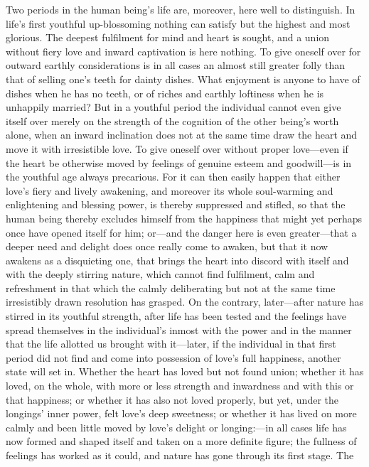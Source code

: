 \documentclass[12pt,a4paper]{book}
\begin{document}
Two periods in the human being's life are, moreover, here well to
distinguish. In life's first youthful up-blossoming nothing can satisfy but
the highest and most glorious. The deepest fulfilment for mind and heart is
sought, and a union without fiery love and inward captivation is here
nothing. To give oneself over for outward earthly considerations is in all
cases an almost still greater folly than that of selling one's teeth for
dainty dishes. What enjoyment is anyone to have of dishes when he has no
teeth, or of riches and earthly loftiness when he is unhappily married? But
in a youthful period the individual cannot even give itself over merely on
the strength of the cognition of the other being's worth alone, when an
inward inclination does not at the same time draw the heart and move it
with irresistible love. To give oneself over without proper love---even if
the heart be otherwise moved by feelings of genuine esteem and
goodwill---is in the youthful age always precarious. For it can then easily
happen that either love's fiery and lively awakening, and moreover its
whole soul-warming and enlightening and blessing power, is thereby
suppressed and stifled, so that the human being thereby excludes himself
from the happiness that might yet perhaps once have opened itself for him;
or---and the danger here is even greater---that a deeper need and delight
does once really come to awaken, but that it now awakens as a disquieting
one, that brings the heart into discord with itself and with the deeply
stirring nature, which cannot find fulfilment, calm and refreshment in that
which the calmly deliberating but not at the same time irresistibly drawn
resolution has grasped. On the contrary, later---after nature has stirred
in its youthful strength, after life has been tested and the feelings have
spread themselves in the individual's inmost with the power and in the
manner that the life allotted us brought with it---later, if the individual
in that first period did not find and come into possession of love's full
happiness, another state will set in. Whether the heart has loved but not
found union; whether it has loved, on the whole, with more or less strength
and inwardness and with this or that happiness; or whether it has also not
loved properly, but yet, under the longings' inner power, felt love's deep
sweetness; or whether it has lived on more calmly and been little moved by
love's delight or longing:---in all cases life has now formed and shaped
itself and taken on a more definite figure; the fullness of feelings has
worked as it could, and nature has gone through its first stage. The
\end{document}
